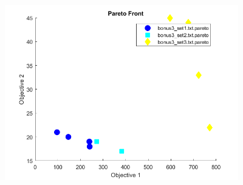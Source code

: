 \documentclass[11pt]{article}
\begin{document}
\begin{figure}[H]
	\centering
  \includegraphics[width=4in]{assn1d_bonus3_pareto.png}
  \label{fig:bonus3_pareto}
\end{figure}
\end{document}
